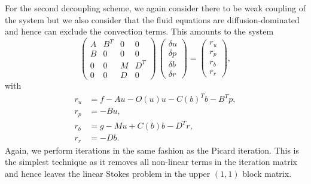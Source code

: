 For the second decoupling scheme, we again consider there to be weak coupling of the system but we also consider that the fluid equations are diffusion-dominated and hence can exclude the convection terms.
This amounts to the system
\begin{equation}
\label{eq:matrix_CD}
\left(
\begin{array}{cccc}
A & B^T & 0 & 0\\
B & 0 & 0 & 0 \\
0 & 0 & M & D^T\\
0 & 0 & D & 0
\end{array}
\right)
\,
\left(
\begin{array}{c}
\delta u\\
\delta p\\
\delta b\\
\delta r
\end{array}
\right)  =
\begin{pmatrix}
r_u \\
r_p\\
r_b\\
r_r
\end{pmatrix},
\end{equation}
with
\begin{align*}
r_u &= f- Au -O(u)u - C(b)^T b- B^T p,\\[0.1cm]
r_p &=-B u,\\[0.1cm]
r_b &=g-Mu+C(b)b-D^T r,\\[0.1cm]
r_r &=-D b.
\end{align*}
Again, we perform iterations in the same fashion as the Picard iteration. This is the simplest technique as it removes all non-linear terms in the iteration matrix and hence leaves the linear Stokes problem in the upper $(1,1)$ block matrix.

